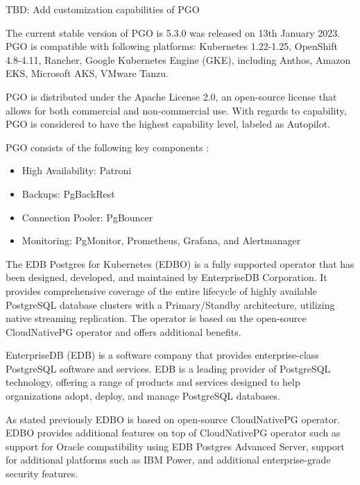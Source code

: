 TBD: Add customization capabilities of PGO

The current stable version of PGO is 5.3.0 was released on 13th January 2023. \cite{ArtifactHubCrunchy}
PGO is compatible with following platforms: Kubernetes 1.22-1.25, OpenShift 4.8-4.11, Rancher, Google Kubernetes Engine (GKE), including Anthos, Amazon EKS, Microsoft AKS, VMware Tanzu. \cite{CrunchyDoc}

PGO is distributed under the Apache License 2.0, an open-source license that allows for both commercial and non-commercial use. With regards to capability, PGO is considered to have the highest capability level, labeled as Autopilot. \cite{OperatorHubCrunchy}

PGO consists of the following key components \cite{CrunchyPGOGit}:
\begin{itemize}
  \item High Availability: Patroni
  \item Backups: PgBackRest
  \item Connection Pooler: PgBouncer
  \item Monitoring: PgMonitor, Prometheus, Grafana, and Alertmanager
\end{itemize}


\pagebreak
{}
The EDB Postgres for Kubernetes (EDBO) is a fully supported operator that has been designed, developed, and maintained by EnterpriseDB Corporation. It provides comprehensive coverage of the entire lifecycle of highly available PostgreSQL database clusters with a Primary/Standby architecture, utilizing native streaming replication. The operator is based on the open-source CloudNativePG operator and offers additional benefits. \cite{OperatorHubEDB}

EnterpriseDB (EDB) is a software company that provides enterprise-class PostgreSQL software and services. EDB is a leading provider of PostgreSQL technology, offering a range of products and services designed to help organizations adopt, deploy, and manage PostgreSQL databases. \cite{EDB}

As stated previously EDBO is based on open-source CloudNativePG operator. EDBO provides additional features on top of CloudNativePG operator such as support for Oracle compatibility using EDB Postgres Advanced Server, support for additional platforms such as IBM Power, and additional enterprise-grade security features. \cite{EDBdocu}

